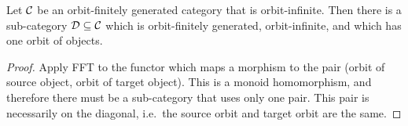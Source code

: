 \begin{corollary}\label{cor:orbit-infinite-subcategory-with-one-orbit}
    Let ${\mathcal C}$ be an orbit-finitely generated category that is orbit-infinite. Then there is a sub-category ${\mathcal D} \subseteq {\mathcal C}$ which is orbit-finitely generated, orbit-infinite, and which has one orbit of objects.
\end{corollary}
\begin{proof}
    Apply FFT to the functor which maps a morphism to the pair (orbit of source object, orbit of target object). This is a monoid homomorphism, and therefore there must be a sub-category that uses only one pair. This pair is necessarily on the diagonal, i.e.~the source orbit and target orbit are the same. 
\end{proof}

